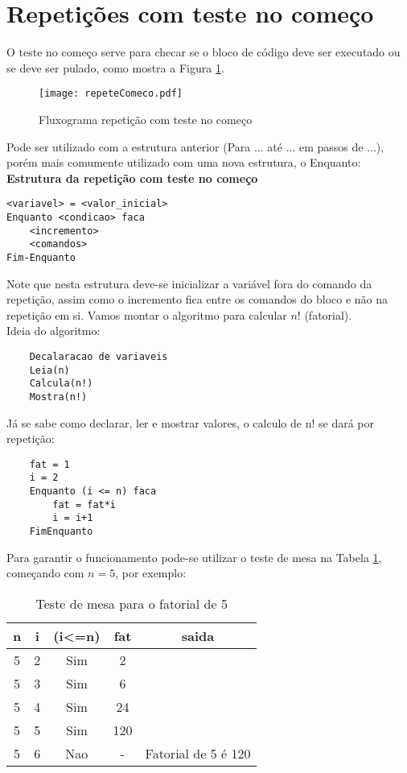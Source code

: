 \section{Repetições com teste no começo}
O teste no começo serve para checar se o bloco de código deve ser executado ou se deve ser pulado, como mostra a Figura \ref{fig:repeteComeco}. 
\begin{figure}[H]
    \centering
    \texttt{[image: repeteComeco.pdf]}
    \caption{Fluxograma repetição com teste no começo}
    \label{fig:repeteComeco}
\end{figure}
Pode ser utilizado com a estrutura anterior (Para ... até ... em passos de ...), porém mais comumente utilizado com uma nova estrutura, o Enquanto: \\
\textbf{Estrutura da repetição com teste no começo} \\
\begin{lstlisting}
<variavel> = <valor_inicial>
Enquanto <condicao> faca
    <incremento>
    <comandos>
Fim-Enquanto
\end{lstlisting}
Note que nesta estrutura deve-se inicializar a variável fora do comando da repetição, assim como o incremento fica entre os comandos do bloco e não na repetição em si. Vamos montar o algoritmo para calcular $n!$ (fatorial). \\
Ideia do algoritmo:
\begin{lstlisting}
    Decalaracao de variaveis
    Leia(n)
    Calcula(n!)
    Mostra(n!)
\end{lstlisting}
Já se sabe como declarar, ler e mostrar valores, o calculo de n! se dará por repetição:
\begin{lstlisting}
    fat = 1
    i = 2
    Enquanto (i <= n) faca
        fat = fat*i
        i = i+1
    FimEnquanto
\end{lstlisting}
Para garantir o funcionamento pode-se utilizar o teste de mesa na Tabela \ref{tab:testefatorial}, começando com $n = 5$, por exemplo:
\begin{table}[!h]
    \centering
    \caption{Teste de mesa para o fatorial de 5}
    \label{tab:testefatorial}
    \begin{tabular}{ccccc} \hline \hline
    n & i & (i\textless=n) & fat & saida               \\ \hline
    5 & 2 & Sim            & 2   &                     \\
    5 & 3 & Sim            & 6   &                     \\
    5 & 4 & Sim            & 24  &                     \\
    5 & 5 & Sim            & 120 &                     \\
    5 & 6 & Nao            & -   & Fatorial de 5 é 120 \\ \hline \hline
    \end{tabular}
    \end{table}
